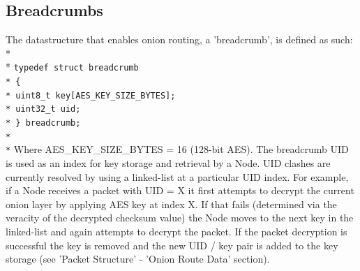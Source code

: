 \documentclass{article}
\begin{document}
\subsection{Breadcrumbs}
The datastructure that enables onion routing, a 'breadcrumb', is defined as such:\\*\\*
\texttt{\-\hspace{1cm}typedef struct breadcrumb\\*
\-\hspace{1cm}\{\\*
\-\hspace{2cm}uint8\_t key[AES\_KEY\_SIZE\_BYTES];\\*
\-\hspace{2cm}uint32\_t uid;\\*
\-\hspace{1cm}\} breadcrumb;\\*\\*}
Where AES\_KEY\_SIZE\_BYTES = 16 (128-bit AES). The breadcrumb UID is used as an index for key storage and retrieval by a Node. UID clashes are currently resolved by
using a linked-list at a particular UID index. For example, if a Node receives a packet with UID = X it first attempts to decrypt the current onion layer by applying
AES key at index X. If that fails (determined via the veracity of the decrypted checksum value) the Node moves to the next key in the linked-list and again attempts
to decrypt the packet. If the packet decryption is successful the key is removed and the new UID / key pair is added to the key storage (see 'Packet Structure' - 'Onion Route Data' section).
\end{document}
